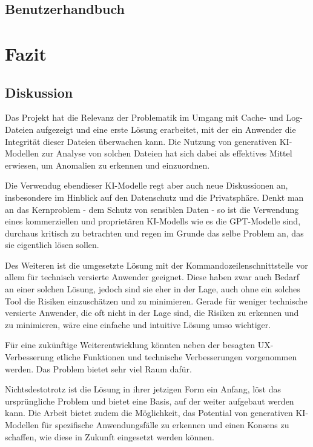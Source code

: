 \documentclass[a4paper,12pt]{report}
\begin{document}
    \clearpage


    \section{Benutzerhandbuch}
    \label{sec:user-manual}


    \chapter{Fazit}


    \section{Diskussion}
    Das Projekt hat die Relevanz der Problematik im Umgang mit Cache- und Log-Dateien aufgezeigt und eine erste Lösung erarbeitet, mit der ein Anwender die Integrität dieser Dateien überwachen kann.
    Die Nutzung von generativen KI-Modellen zur Analyse von solchen Dateien hat sich dabei als effektives Mittel erwiesen, um Anomalien zu erkennen und einzuordnen.

    Die Verwendug ebendieser KI-Modelle regt aber auch neue Diskussionen an, insbesondere im Hinblick auf den Datenschutz und die Privatsphäre.
    Denkt man an das Kernproblem - dem Schutz von sensiblen Daten - so ist die Verwendung eines kommerziellen und proprietären KI-Modells wie es die GPT-Modelle sind, durchaus kritisch zu betrachten
    und regen im Grunde das selbe Problem an, das sie eigentlich lösen sollen.

    Des Weiteren ist die umgesetzte Lösung mit der Kommandozeilenschnittstelle vor allem für technisch versierte Anwender geeignet.
    Diese haben zwar auch Bedarf an einer solchen Lösung, jedoch sind sie eher in der Lage, auch ohne ein solches Tool die Risiken einzuschätzen und zu minimieren.
    Gerade für weniger technische versierte Anwender, die oft nicht in der Lage sind, die Risiken zu erkennen und zu minimieren, wäre eine einfache und intuitive Lösung umso wichtiger.

    Für eine zukünftige Weiterentwicklung könnten neben der besagten UX-Verbesserung etliche Funktionen und technische Verbesserungen vorgenommen werden.
    Das Problem bietet sehr viel Raum dafür.

    Nichtsdestotrotz ist die Lösung in ihrer jetzigen Form ein Anfang, löst das ursprüngliche Problem und bietet eine Basis, auf der weiter aufgebaut werden kann.
    Die Arbeit bietet zudem die Möglichkeit, das Potential von generativen KI-Modellen für spezifische Anwendungsfälle zu erkennen und einen Konsens zu schaffen, wie diese in Zukunft eingesetzt werden können.
\end{document}
